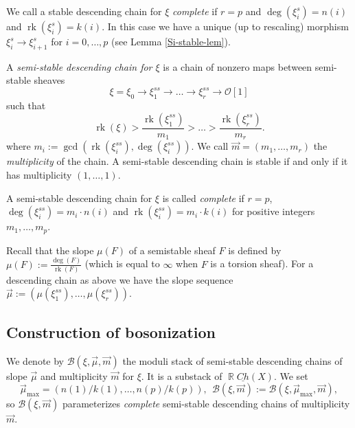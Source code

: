\documentclass[reqno]{amsart}
\DeclareMathOperator\R{\mathbb R}
\theoremstyle{definition}
\theoremstyle{remark}
\newcommand{\rk}{\operatorname{rk}}
\newcommand{\cO}{\mathcal{O}}
\newcommand{\sB}{\mathscr{B}}
\newcommand{\uchain}{\underline{Ch}}
\newcommand{\am}{\overrightarrow{m}}
\newcommand{\amu}{\overrightarrow{\mu}}
\numberwithin{equation}{section}
\begin{document}
We call a stable descending chain for $\xi$ 
\emph{complete} if  $r=p$ and
$\deg(\xi^{s}_i)=n(i)$ and $\rk(\xi^{s}_i)=k(i)$. 
In this case we have a unique (up to rescaling) morphism $\xi^{s}_i\to \xi^{s}_{i+1}$ for $i=0,\ldots,p$ (see Lemma \ref{Si-stable-lem}).
 
 A \emph{semi-stable descending chain for $\xi$} is a chain of nonzero maps between semi-stable sheaves 
\[
\xi=\xi_0\to \xi^{ss}_1\to\ldots\to \xi^{ss}_r\to \cO[1]
\] such that 
\[
\rk(\xi)>\frac{\rk(\xi^{ss}_1)}{m_1}>\ldots>\frac{\rk(\xi^{ss}_r)}{m_r}.
\] 
where $m_i:=\gcd(\rk(\xi^{ss}_i),\deg(\xi^{ss}_i))$. We call $\am=(m_1,\ldots,m_r)$ the \emph{multiplicity}  of the chain. 
A semi-stable descending chain is stable if and only if it has multiplicity $(1,\ldots,1)$. 

A semi-stable descending chain for $\xi$ is called \emph{complete}  if $r=p$, 
$\deg(\xi^{ss}_i)=m_i\cdot n(i)$ and $\rk(\xi^{ss}_i)=m_i\cdot k(i)$ for positive integers $m_1,\ldots, m_p$. 

Recall that the slope $\mu(F)$ of a semistable sheaf $F$ is defined by $\mu(F):=\frac{\deg(F)}{\rk(F)}$ (which is equal to $\infty$ when $F$ is a torsion sheaf).
For a descending chain as above we have the slope sequence $\amu:=(\mu(\xi^{ss}_1),\ldots,\mu(\xi^{ss}_r))$.

\subsection{Construction of bosonization}
We denote by $\sB(\xi,\amu, \am)$ the moduli stack of semi-stable descending chains of slope $\amu$ and multiplicity $\am$ for $\xi$. It is a substack of $\R\uchain(X)$. We set 
\[
\amu_{\max}=(n(1)/k(1),\ldots,n(p)/k(p)), \ \ \sB(\xi,\am):=\sB(\xi,\amu_{\max},\am),
\] 
so $\sB(\xi,\am)$ parameterizes {\it complete} semi-stable descending chains of multiplicity $\am$.
\end{document}
